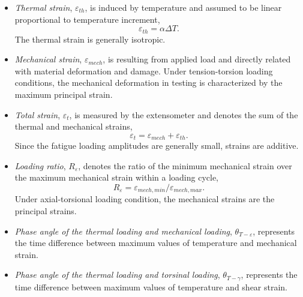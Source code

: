 \begin{itemize}
  \item {\em Thermal strain}, $\varepsilon_{th}$, is induced by temperature and assumed to be linear proportional to temperature increment, 
  \begin{equation}
  \varepsilon_{th}=\alpha\Delta T.
  \label{Equ:thermal_strain}
  \end{equation} 
  The thermal strain is generally isotropic.
  \item {\em Mechanical strain}, $\varepsilon_{mech}$, is resulting from applied load and directly related with material deformation and damage. Under tension-torsion loading conditions, the mechanical deformation in testing is characterized by the maximum principal strain.
  \item {\em Total strain}, $\varepsilon_t$, is measured by the extensometer and denotes the sum of the thermal and mechanical strains, 
  \begin{equation}
  \varepsilon_t=\varepsilon_{mech}+\varepsilon_{th}.
  \label{Equ:total_strain}
  \end{equation}
  Since the fatigue loading amplitudes are generally small, strains are additive.
  \item {\em Loading ratio}, $R_{\varepsilon}$, denotes the ratio of the minimum mechanical strain over the maximum mechanical strain within a loading cycle,
  \begin{equation}
  R_{\varepsilon}=\varepsilon_{mech,min}/\varepsilon_{mech,max}.
  \end{equation}
  Under axial-torsional loading condition, the mechanical strains are the principal strains.
  \item {\em Phase angle of the thermal loading and mechanical loading}, $\theta_{T-\varepsilon}$, represents the time difference between maximum values of temperature and mechanical strain.
  \item {\em Phase angle of the thermal loading and torsinal loading}, $\theta_{T-\gamma}$, represents the time difference between maximum values of temperature and shear strain.

\end{itemize}
